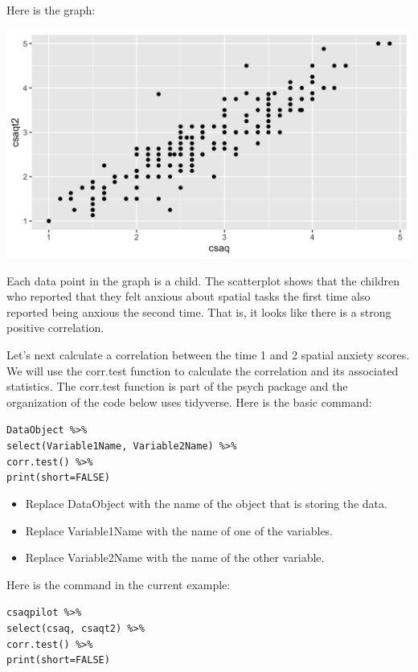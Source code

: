 \documentclass[
]{book}
\providecommand{\tightlist}{%
  \setlength{\itemsep}{0pt}\setlength{\parskip}{0pt}}
\begin{document}
Here is the graph:

\includegraphics{img/4R.5.png}

Each data point in the graph is a child. The scatterplot shows that the children who reported that they felt anxious about spatial tasks the first time also reported being anxious the second time. That is, it looks like there is a strong positive correlation.

Let's next calculate a correlation between the time 1 and 2 spatial anxiety scores. We will use the corr.test function to calculate the correlation and its associated statistics. The corr.test function is part of the psych package and the organization of the code below uses tidyverse. Here is the basic command:

\texttt{DataObject\ \%\textgreater{}\%}\\
\texttt{select(Variable1Name,\ Variable2Name)\ \%\textgreater{}\%}~\\
\texttt{corr.test()\ \%\textgreater{}\%}~\\
\texttt{print(short=FALSE)}

\begin{itemize}
\tightlist
\item
  Replace DataObject with the name of the object that is storing the data.\\
\item
  Replace Variable1Name with the name of one of the variables.\\
\item
  Replace Variable2Name with the name of the other variable.
\end{itemize}

Here is the command in the current example:

\texttt{csaqpilot\ \%\textgreater{}\%}\\
\texttt{select(csaq,\ csaqt2)\ \%\textgreater{}\%}~\\
\texttt{corr.test()\ \%\textgreater{}\%}~\\
\texttt{print(short=FALSE)}
\end{document}
